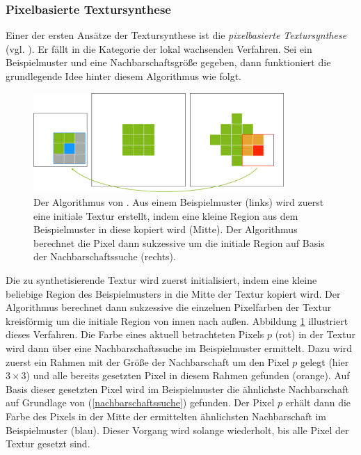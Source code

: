 \subsubsection{Pixelbasierte Textursynthese}

Einer der ersten Ansätze der Textursynthese ist die \emph{pixelbasierte Textursynthese} (vgl. \cite{EL99}).
Er fällt in die Kategorie der lokal wachsenden Verfahren.
Sei ein Beispielmuster und eine Nachbarschaftsgröße gegeben, dann funktioniert die grundlegende Idee hinter diesem Algorithmus wie folgt.

\begin{figure}
	\centering
	\includegraphics[width=0.85\textwidth]{images/pixelbased}
	\caption{
		Der Algorithmus von \cite{EL99}.
		Aus einem Beispielmuster (links) wird zuerst eine initiale Textur erstellt, indem eine kleine Region aus dem Beispielmuster in diese kopiert wird (Mitte). Der Algorithmus berechnet die Pixel dann sukzessive um die initiale Region auf Basis der Nachbarschaftssuche (rechts).
	}
	\label{pixelbased}
\end{figure}

Die zu synthetisierende Textur wird zuerst initialisiert, indem eine kleine beliebige Region des Beispielmusters in die Mitte der Textur kopiert wird.
Der Algorithmus berechnet dann sukzessive die einzelnen Pixelfarben der Textur kreisförmig um die initiale Region von innen nach außen.
Abbildung \ref{pixelbased} illustriert dieses Verfahren.
Die Farbe eines aktuell betrachteten Pixels $p$ (rot) in der Textur wird dann über eine Nachbarschaftssuche im Beispielmuster ermittelt.
Dazu wird zuerst ein Rahmen mit der Größe der Nachbarschaft um den Pixel $p$ gelegt (hier $3 \times 3$) und alle bereits gesetzten Pixel in diesem Rahmen gefunden (orange).
Auf Basis dieser gesetzten Pixel wird im Beispielmuster die ähnlichste Nachbarschaft auf Grundlage von (\ref{nachbarschaftssuche}) gefunden.
Der Pixel $p$ erhält dann die Farbe des Pixels in der Mitte der ermittelten ähnlichsten Nachbarschaft im Beispielmuster (blau).
Dieser Vorgang wird solange wiederholt, bis alle Pixel der Textur gesetzt sind.

